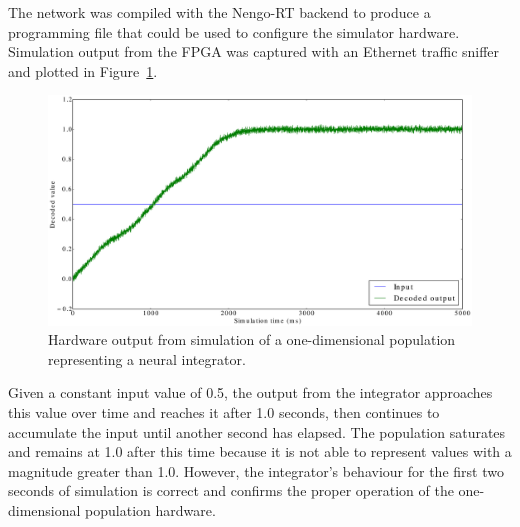 \documentclass[english]{article}
\newcommand{\design}{Nengo-RT}
\begin{document}
The network was compiled with the \design{} backend to produce a programming file that could be used to configure the simulator hardware.
Simulation output from the FPGA was captured with an Ethernet traffic sniffer and plotted in Figure~\ref{fig:integrator1d}.

\begin{figure}
\centering

\includegraphics[width=6in]{integrator-1d.eps}

\caption[Simulation of a 1D neural integrator.]
{Hardware output from simulation of a one-dimensional population representing a neural integrator.}

\label{fig:integrator1d}
\end{figure}

Given a constant input value of 0.5, the output from the integrator approaches this value
over time and reaches it after 1.0 seconds, then continues to accumulate the input until
another second has elapsed. The population saturates and remains at 1.0 after this time
because it is not able to represent values with a magnitude greater than 1.0. However,
the integrator's behaviour for the first two seconds of simulation is correct and confirms
the proper operation of the one-dimensional population hardware.
\end{document}
